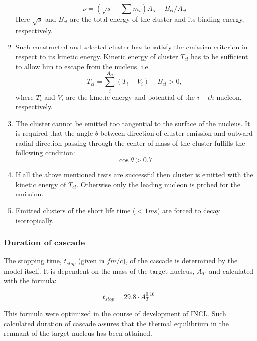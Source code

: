 \begin{enumerate}[label=(\roman*)]
	\begin{equation}
		\nu=\left(\sqrt{s}-\sum m_i\right)A_{cl}- B_{cl}/A_{cl} 
	\end{equation}
    Here $\sqrt{s}$ and $B_{cl}$ are the total energy of the cluster and its binding energy, respectively.
	\item Such constructed and selected cluster has to satisfy the emission criterion in respect to its kinetic energy.
	Kinetic energy of cluster $T_{cl}$ has to be sufficient to allow him to escape from the nucleus, i.e. 
	\begin{equation}
		T_{cl}=\sum_{i}^{A_{cl}}\left(T_i-V_i\right)-B_{cl}>0,
	\end{equation}
	where $T_i$ and $V_i$ are the kinetic energy and potential of the $i-th$ nucleon, respectively.	
	\item The cluster cannot be emitted too tangential to the surface of the nucleus. It is required that the angle $\theta$ 
	between direction of cluster emission and outward radial direction passing through 
	the center of mass of the cluster fulfills the following condition:
	\begin{equation}
		\cos\theta>0.7
	\end{equation}
	\item If all the above mentioned tests are successful then cluster is emitted with
	the kinetic energy of $T_{cl}$. 
	Otherwise only the leading nucleon is probed for the emission.
	\item Emitted clusters of the short life time ($<1 ms$) are forced to decay isotropically.
\end{enumerate}

\subsubsection{Duration of cascade}

The stopping time, $t_{stop}$ (given in $fm/c$), of the cascade is determined by the model itself. 
It is dependent on the mass of the target nucleus, $A_T$, and calculated with the formula: 

\begin{equation}
	t_{stop}=29.8 \cdot A_{T}^{0.16}
\end{equation}

This formula were optimized in the course of development of INCL. 
Such calculated duration of cascade assures that 
the thermal equilibrium in the remnant of the target nucleus has been attained. 

